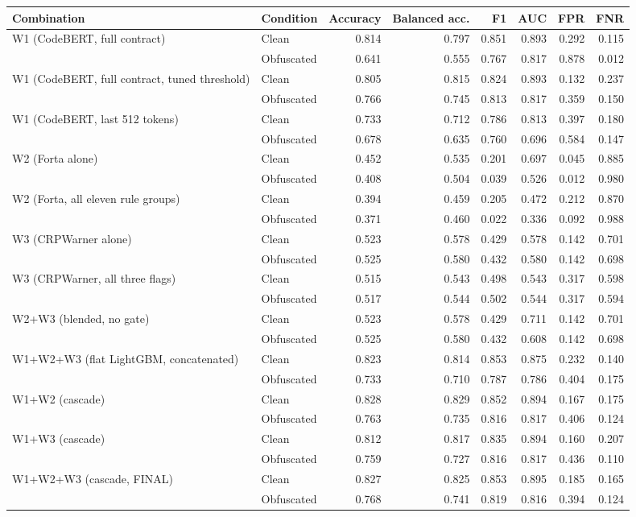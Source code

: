\begin{tabular}{llrrrrrr}
\toprule
Combination & Condition & Accuracy & Balanced acc. & F1 & AUC & FPR & FNR \\
\midrule
\multirow{2}{*}{W1 (CodeBERT, full contract)} & Clean & 0.814 & 0.797 & 0.851 & 0.893 & 0.292 & 0.115 \\
 & Obfuscated & 0.641 & 0.555 & 0.767 & 0.817 & 0.878 & 0.012 \\
\multirow{2}{*}{W1 (CodeBERT, full contract, tuned threshold)} & Clean & 0.805 & 0.815 & 0.824 & 0.893 & 0.132 & 0.237 \\
 & Obfuscated & 0.766 & 0.745 & 0.813 & 0.817 & 0.359 & 0.150 \\
\multirow{2}{*}{W1 (CodeBERT, last 512 tokens)} & Clean & 0.733 & 0.712 & 0.786 & 0.813 & 0.397 & 0.180 \\
 & Obfuscated & 0.678 & 0.635 & 0.760 & 0.696 & 0.584 & 0.147 \\
\multirow{2}{*}{W2 (Forta alone)} & Clean & 0.452 & 0.535 & 0.201 & 0.697 & 0.045 & 0.885 \\
 & Obfuscated & 0.408 & 0.504 & 0.039 & 0.526 & 0.012 & 0.980 \\
\multirow{2}{*}{W2 (Forta, all eleven rule groups)} & Clean & 0.394 & 0.459 & 0.205 & 0.472 & 0.212 & 0.870 \\
 & Obfuscated & 0.371 & 0.460 & 0.022 & 0.336 & 0.092 & 0.988 \\
\multirow{2}{*}{W3 (CRPWarner alone)} & Clean & 0.523 & 0.578 & 0.429 & 0.578 & 0.142 & 0.701 \\
 & Obfuscated & 0.525 & 0.580 & 0.432 & 0.580 & 0.142 & 0.698 \\
\multirow{2}{*}{W3 (CRPWarner, all three flags)} & Clean & 0.515 & 0.543 & 0.498 & 0.543 & 0.317 & 0.598 \\
 & Obfuscated & 0.517 & 0.544 & 0.502 & 0.544 & 0.317 & 0.594 \\
\multirow{2}{*}{W2+W3 (blended, no gate)} & Clean & 0.523 & 0.578 & 0.429 & 0.711 & 0.142 & 0.701 \\
 & Obfuscated & 0.525 & 0.580 & 0.432 & 0.608 & 0.142 & 0.698 \\
\multirow{2}{*}{W1+W2+W3 (flat LightGBM, concatenated)} & Clean & 0.823 & 0.814 & 0.853 & 0.875 & 0.232 & 0.140 \\
 & Obfuscated & 0.733 & 0.710 & 0.787 & 0.786 & 0.404 & 0.175 \\
\multirow{2}{*}{W1+W2 (cascade)} & Clean & 0.828 & 0.829 & 0.852 & 0.894 & 0.167 & 0.175 \\
 & Obfuscated & 0.763 & 0.735 & 0.816 & 0.817 & 0.406 & 0.124 \\
\multirow{2}{*}{W1+W3 (cascade)} & Clean & 0.812 & 0.817 & 0.835 & 0.894 & 0.160 & 0.207 \\
 & Obfuscated & 0.759 & 0.727 & 0.816 & 0.817 & 0.436 & 0.110 \\
\multirow{2}{*}{W1+W2+W3 (cascade, FINAL)} & Clean & 0.827 & 0.825 & 0.853 & 0.895 & 0.185 & 0.165 \\
 & Obfuscated & 0.768 & 0.741 & 0.819 & 0.816 & 0.394 & 0.124 \\
\bottomrule
\end{tabular}